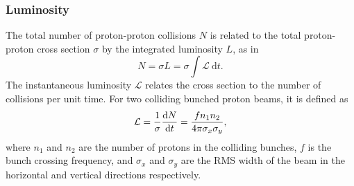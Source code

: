 \subsubsection{Luminosity}
The total number of proton-proton collisions $N$ is related to the total proton-proton cross section $\sigma$ by the integrated luminosity $L$, as in
%
\begin{equation}
  N = \sigma L = \sigma \int \mathcal{L} ~\mathrm{d}t .
\end{equation}
%
The instantaneous luminosity $\mathcal{L}$ relates the cross section to the number of collisions per unit time.
For two colliding bunched proton beams, it is defined as
%
\begin{equation}\label{eq:lumi_def}
  \mathcal{L} = \frac{1}{\sigma} \frac{\mathrm{d}N}{\mathrm{d}t} = \frac{f n_1 n_2}{4 \pi \sigma_x \sigma_y},
\end{equation}
%
where $n_1$ and $n_2$ are the number of protons in the colliding bunches, $f$ is the bunch crossing frequency, and $\sigma_x$ and $\sigma_y$ are the RMS width of the beam in the horizontal and vertical directions respectively.

